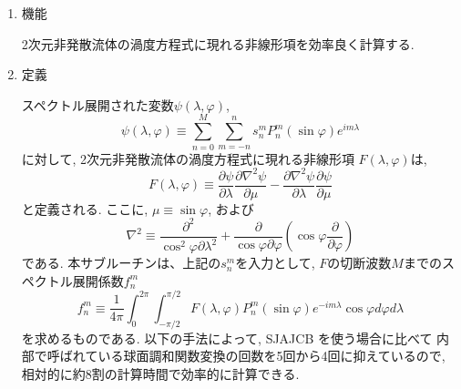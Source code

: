 \documentclass[a4j]{jarticle}
\begin{document}
\begin{enumerate}

\item 機能

2次元非発散流体の渦度方程式に現れる非線形項を効率良く計算する.

\item 定義

スペクトル展開された変数$\psi(\lambda,\varphi)$,
\begin{equation}
\psi(\lambda,\varphi)\equiv\sum_{n=0}^M\sum_{m=-n}^n 
s^m_n P^m_n(\sin\varphi) e^{im\lambda}
\end{equation}
に対して,  2次元非発散流体の渦度方程式に現れる非線形項
$F(\lambda,\varphi)$は,
\begin{equation}
F(\lambda,\varphi)\equiv
 \frac{\partial\psi}{\partial\lambda}\frac{\partial\nabla^2\psi}{\partial\mu}
-\frac{\partial\nabla^2\psi}{\partial\lambda}\frac{\partial\psi}{\partial\mu}
\end{equation}
と定義される. ここに, $\mu\equiv\sin\varphi$, および
\begin{equation}
\nabla^2\equiv
\frac{\partial^2}{\cos^2\varphi\partial\lambda^2}
+\frac{\partial}{\cos\varphi\partial\varphi}
\left(\cos\varphi\frac{\partial}{\partial\varphi}\right)
\end{equation}
である.
本サブルーチンは、上記の$s^m_n$を入力として,
$F$の切断波数$M$までのスペクトル展開係数$f^m_n$
\begin{equation}
f^m_n\equiv\frac1{4\pi}\int^{2\pi}_0\int^{\pi/2}_{-\pi/2}
F(\lambda,\varphi)P^m_n(\sin\varphi)e^{-im\lambda}\cos\varphi d\varphi d\lambda
\end{equation}
を求めるものである. 以下の手法によって, SJAJCB を使う場合に比べて
内部で呼ばれている球面調和関数変換の回数を5回から4回に抑えているので,
相対的に約8割の計算時間で効率的に計算できる.


\end{enumerate}
\end{document}

